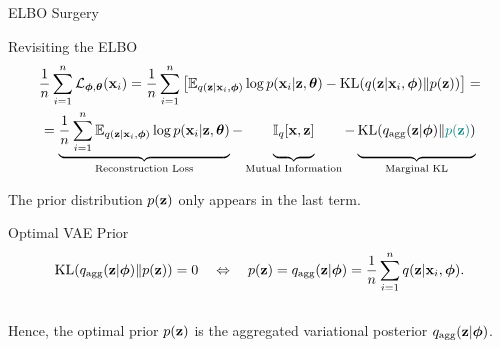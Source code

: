 \documentclass{beamer}
\begin{document}
\begin{frame}{ELBO Surgery}
	\vspace{-0.3cm}
	\begin{block}{Revisiting the ELBO}
		\vspace{-0.7cm}
		{\small
		\begin{multline*}
		    \frac{1}{n}\sum_{i=1}^n \cL_{\bphi, \btheta}(\bx_i) = \frac{1}{n} \sum_{i=1}^n \left[ \bbE_{q(\bz | \bx_i, \bphi)} \log p(\bx_i | \bz, \btheta) - \KL(q(\bz | \bx_i, \bphi) \| p(\bz)) \right] = \\
		    = \underbrace{\frac{1}{n} \sum_{i=1}^n \bbE_{q(\bz | \bx_i, \bphi)} \log p(\bx_i | \bz, \btheta)}_{\text{Reconstruction Loss}} - \underbrace{\vphantom{ \sum_{i=1}^n} \bbI_q [\bx, \bz]}_{\text{Mutual Information}} - \underbrace{\vphantom{ \sum_{i=1}^n} \KL(q_{\text{agg}}(\bz | \bphi) \| {\color{teal}p(\bz)})}_{\text{Marginal KL}}
		\end{multline*}
		}
		\vspace{-0.3cm}
	\end{block}
	The prior distribution $p(\mathbf{z})$ only appears in the last term.
	\begin{block}{Optimal VAE Prior}
		\vspace{-0.7cm}
		\[
	  		\mathrm{KL}(q_{\text{agg}}(\mathbf{z} | \boldsymbol{\phi}) \| p(\mathbf{z})) = 0 \quad \Leftrightarrow \quad p (\mathbf{z}) = q_{\text{agg}}(\mathbf{z} | \boldsymbol{\phi}) = \frac{1}{n} \sum_{i=1}^n q(\mathbf{z} | \mathbf{x}_i, \boldsymbol{\phi}).
		\]
		\vspace{-0.4cm} \\
		Hence, the optimal prior $p(\mathbf{z})$ is the aggregated variational posterior $q_{\text{agg}}(\mathbf{z} | \boldsymbol{\phi})$.
	\end{block}
	
\end{frame}
\end{document}
